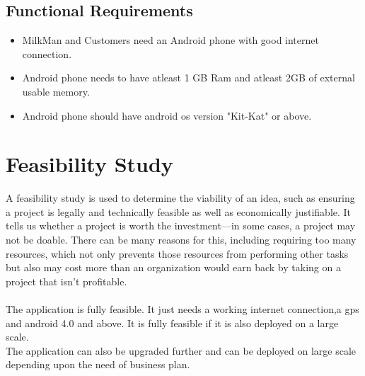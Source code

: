 \subsection{Functional Requirements}
\begin{itemize}
	\item MilkMan and Customers need an Android phone with good internet connection.
	\item Android phone needs to have atleast 1 GB Ram and atleast 2GB of external usable memory.
	\item Android phone should have android os version "Kit-Kat" or above.
\end{itemize}
\section{Feasibility Study}
A feasibility study is used to determine the viability of an idea, such as ensuring a project is legally and technically feasible as well as economically justifiable. It tells us whether a project is worth the investment—in some cases, a project may not be doable. There can be many reasons for this, including requiring too many resources, which not only prevents those resources from performing other tasks but also may cost more than an organization would earn back by taking on a project that isn’t profitable.\\
\\
The application is fully feasible. It just needs a working internet connection,a gps and android 4.0 and above. It is fully feasible if it is also deployed on a large scale.\\
The application can also be upgraded further and can be deployed on large scale depending upon the need of business plan.\\
